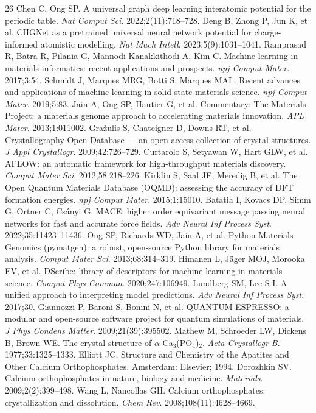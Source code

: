 \documentclass[11pt,a4paper]{article}
\begin{document}
\begin{thebibliography}{26}
 Chen C, Ong SP. A universal graph deep learning interatomic potential for the periodic table. \textit{Nat Comput Sci}. 2022;2(11):718--728.
 Deng B, Zhong P, Jun K, et al. CHGNet as a pretrained universal neural network potential for charge-informed atomistic modelling. \textit{Nat Mach Intell}. 2023;5(9):1031--1041.
 Ramprasad R, Batra R, Pilania G, Mannodi-Kanakkithodi A, Kim C. Machine learning in materials informatics: recent applications and prospects. \textit{npj Comput Mater}. 2017;3:54.
 Schmidt J, Marques MRG, Botti S, Marques MAL. Recent advances and applications of machine learning in solid-state materials science. \textit{npj Comput Mater}. 2019;5:83.
 Jain A, Ong SP, Hautier G, et al. Commentary: The Materials Project: a materials genome approach to accelerating materials innovation. \textit{APL Mater}. 2013;1:011002.
 Gra\v{z}ulis S, Chateigner D, Downs RT, et al. Crystallography Open Database --- an open-access collection of crystal structures. \textit{J Appl Crystallogr}. 2009;42:726--729.
 Curtarolo S, Setyawan W, Hart GLW, et al. AFLOW: an automatic framework for high-throughput materials discovery. \textit{Comput Mater Sci}. 2012;58:218--226.
 Kirklin S, Saal JE, Meredig B, et al. The Open Quantum Materials Database (OQMD): assessing the accuracy of DFT formation energies. \textit{npj Comput Mater}. 2015;1:15010.
 Batatia I, Kovacs DP, Simm G, Ortner C, Cs\'anyi G. MACE: higher order equivariant message passing neural networks for fast and accurate force fields. \textit{Adv Neural Inf Process Syst}. 2022;35:11423--11436.
 Ong SP, Richards WD, Jain A, et al. Python Materials Genomics (pymatgen): a robust, open-source Python library for materials analysis. \textit{Comput Mater Sci}. 2013;68:314--319.
 Himanen L, J\"ager MOJ, Morooka EV, et al. DScribe: library of descriptors for machine learning in materials science. \textit{Comput Phys Commun}. 2020;247:106949.
 Lundberg SM, Lee S-I. A unified approach to interpreting model predictions. \textit{Adv Neural Inf Process Syst}. 2017;30.
 Giannozzi P, Baroni S, Bonini N, et al. QUANTUM ESPRESSO: a modular and open-source software project for quantum simulations of materials. \textit{J Phys Condens Matter}. 2009;21(39):395502.
 Mathew M, Schroeder LW, Dickens B, Brown WE. The crystal structure of $\alpha$-Ca$_3$(PO$_4$)$_2$. \textit{Acta Crystallogr B}. 1977;33:1325--1333.
 Elliott JC. Structure and Chemistry of the Apatites and Other Calcium Orthophosphates. Amsterdam: Elsevier; 1994.
 Dorozhkin SV. Calcium orthophosphates in nature, biology and medicine. \textit{Materials}. 2009;2(2):399--498.
 Wang L, Nancollas GH. Calcium orthophosphates: crystallization and dissolution. \textit{Chem Rev}. 2008;108(11):4628--4669.
\end{thebibliography}
\end{document}
